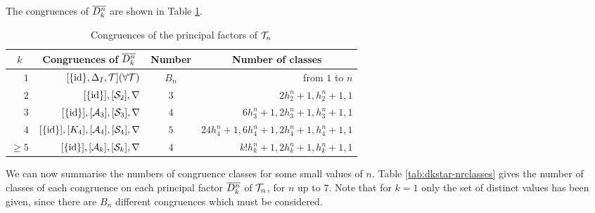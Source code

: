 \begin{theorem}
  \label{thm:dkstar-congs}
  The congruences of $\overline{D_k^n}$ are shown in Table \ref{tab:dkstar-congs}.
  \begin{table}[ht]
    \centering
    \renewcommand{\arraystretch}{1.3}
    \begin{tabular}{| r | r | c | r |}
      \hline
      \multicolumn{1}{|c|}{$k$} & \multicolumn{1}{c|}{\textbf{Congruences of $\overline{D_k^n}$}} & \textbf{Number} & \multicolumn{1}{c|}{\textbf{Number of classes}} \\
      \hline
      $1$ & $[\{\operatorname{id}\}, \Delta_I, \mathcal{T}] (\forall \mathcal{T})$ & $B_n$
          & from $1$ to $n$ \\
      $2$ & $[\{\operatorname{id}\}], [\mathcal{S}_2], \nabla$ & $3$ & $2h_2^n+1, h_2^n+1, 1$ \\
      $3$ & $[\{\operatorname{id}\}], [\mathcal{A}_3], [\mathcal{S}_3], \nabla$ & $4$ & $6h_3^n+1, 2h_3^n+1, h_3^n+1, 1$ \\
      $4$ & $[\{\operatorname{id}\}], [K_4], [\mathcal{A}_4], [\mathcal{S}_4], \nabla$ & $5$ & $24h_4^n+1, 6h_4^n+1, 2h_4^n+1, h_4^n+1, 1$ \\
      $\geq 5$ & $[\{\operatorname{id}\}], [\mathcal{A}_k], [\mathcal{S}_k], \nabla$ & $4$ & $k!h_k^n+1, 2h_k^n+1, h_k^n+1, 1$ \\
      \hline
    \end{tabular}
    \caption{Congruences of the principal factors of $\mathcal{T}_n$}
    \label{tab:dkstar-congs}
  \end{table}
\end{theorem}

We can now summarise the numbers of congruence classes for some small values of
$n$.  Table \ref{tab:dkstar-nrclasses} gives the number of classes of each
congruence on each principal factor $\overline{D_k^n}$ of $\mathcal{T}_n$, for $n$ up to $7$.
Note that for $k=1$ only the set of distinct values has been given, since there
are $B_n$ different congruences which must be considered.

